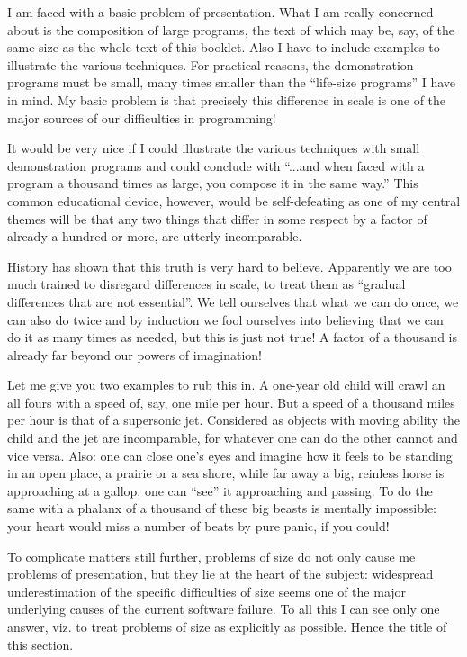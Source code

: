 I am faced with a basic problem of presentation. What I am really concerned about is the composition of large programs, the text of which may be, say, of the same size as the whole text of this booklet. Also I have to include examples to illustrate the various techniques. For practical reasons, the demonstration programs must be small, many times smaller than the ``life-size programs'' I have in mind. My basic problem is that precisely this difference in scale is one of the major sources of our difficulties in programming!

It would be very nice if I could illustrate the various techniques with small demonstration programs and could conclude with ``...and when faced with a program a thousand times as large, you compose it in the same way.'' This common educational device, however, would be self-defeating as one of my central themes will be that any two things that differ in some respect by a factor of already a hundred or more, are utterly incomparable.

History has shown that this truth is very hard to believe. Apparently we are too much trained to disregard differences in scale, to treat them as ``gradual differences that are not essential''. We tell ourselves that what we can do once, we can also do twice and by induction we fool ourselves into believing that we can do it as many times as needed, but this is just not true! A factor of a thousand is already far beyond our powers of imagination!

Let me give you two examples to rub this in. A one-year old child will crawl an all fours with a speed of, say, one mile per hour. But a speed of a thousand miles per hour is that of a supersonic jet. Considered as objects with moving ability the child and the jet are incomparable, for whatever one can do the other cannot and vice versa. Also: one can close one's eyes and imagine how it feels to be standing in an open place, a prairie or a sea shore, while far away a big, reinless horse is approaching at a gallop, one can ``see'' it approaching and passing. To do the same with a phalanx of a thousand of these big beasts is mentally impossible: your heart would miss a number of beats by pure panic, if you could!

To complicate matters still further, problems of size do not only cause me problems of presentation, but they lie at the heart of the subject: widespread underestimation of the specific difficulties of size seems one of the major underlying causes of the current software failure. To all this I can see only one answer, viz. to treat problems of size as explicitly as possible. Hence the title of this section.

